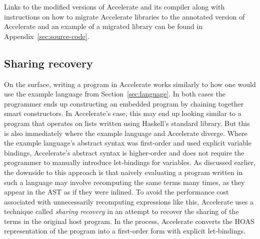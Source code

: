 \documentclass[fontsize=11pt,a4paper,parskip=half,numbers=noenddot]{scrartcl}
\begin{document}
Links to the modified versions of Accelerate and its compiler along with
instructions on how to migrate Accelerate libraries to the annotated version of
Accelerate and an example of a migrated library can be found in
Appendix~\ref{sec:source-code}.

\subsection{Sharing recovery}


On the surface, writing a program in Accelerate works similarly to how one would
use the example language from Section~\ref{sec:language}. In both cases the
programmer ends up constructing an embedded program by chaining together smart
constructors. In Accelerate's case, this may end up looking similar to a program
that operates on lists written using Haskell's standard library. But this is
also immediately where the example language and Accelerate diverge. Where the
example language's abstract syntax was first-order and used explicit variable
bindings, Accelerate's abstract syntax is higher-order and does not require the
programmer to manually introduce let-bindings for variables. As discussed
earlier, the downside to this approach is that naively evaluating a program
written in such a language may involve recomputing the same terms many times, as
they appear in the AST as if they were inlined. To avoid the performance cost
associated with unnecessarily recomputing expressions like this, Accelerate uses
a technique called \emph{sharing recovery} in an attempt to recover the sharing
of the terms in the original host program. In the process, Accelerate converts
the HOAS representation of the program into a first-order form with explicit
let-bindings.
\end{document}
